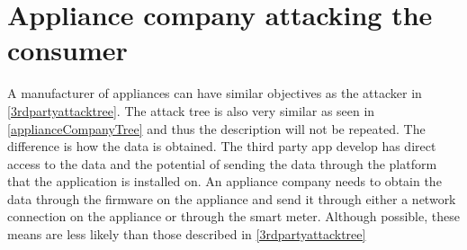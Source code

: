 
\section{Appliance company attacking the consumer}
A manufacturer of appliances can have similar objectives as the attacker in \cref{3rdpartyattacktree}.
The attack tree is also very similar as seen in \cref{applianceCompanyTree} and thus the description will not be repeated.
The difference is how the data is obtained.
The third party app develop has direct access to the data and the potential of sending the data through the platform that the application is installed on.
An appliance company needs to obtain the data through the firmware on the appliance and send it through either a network connection on the appliance or through the smart meter.
Although possible, these means are less likely than those described in \cref{3rdpartyattacktree}


